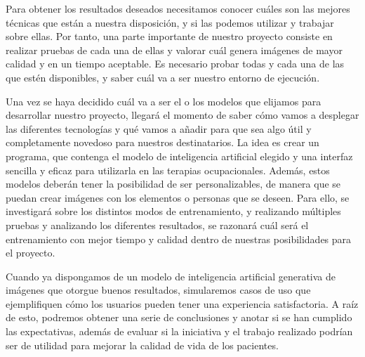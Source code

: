 Para obtener los resultados deseados necesitamos conocer cuáles son las mejores técnicas que están a nuestra disposición, y si las podemos utilizar y trabajar sobre ellas. Por tanto, una parte importante de nuestro proyecto consiste en realizar pruebas de cada una de ellas y valorar cuál genera imágenes de mayor calidad y en un tiempo aceptable. Es necesario probar todas y cada una de las que estén disponibles, y saber cuál va a ser nuestro entorno de ejecución.

Una vez se haya decidido cuál va a ser el o los modelos que elijamos para desarrollar nuestro proyecto, llegará el momento de saber cómo vamos a desplegar las diferentes tecnologías y qué vamos a añadir para que sea algo útil y completamente novedoso para nuestros destinatarios. La idea es crear un programa, que contenga el modelo de inteligencia artificial elegido y una interfaz sencilla y eficaz para utilizarla en las terapias ocupacionales. Además, estos modelos deberán tener la posibilidad de ser personalizables, de manera que se puedan crear imágenes con los elementos o personas que se deseen. Para ello, se investigará sobre los distintos modos de entrenamiento, y realizando múltiples pruebas y analizando los diferentes resultados, se razonará cuál será el entrenamiento con mejor tiempo y calidad dentro de nuestras posibilidades para el proyecto.

Cuando ya dispongamos de un modelo de inteligencia artificial generativa de imágenes que otorgue buenos resultados, simularemos casos de uso que ejemplifiquen cómo los usuarios pueden tener una experiencia satisfactoria. A raíz de esto, podremos obtener una serie de conclusiones y anotar si se han cumplido las expectativas, además de evaluar si la iniciativa y el trabajo realizado podrían ser de utilidad para mejorar la calidad de vida de los pacientes.
